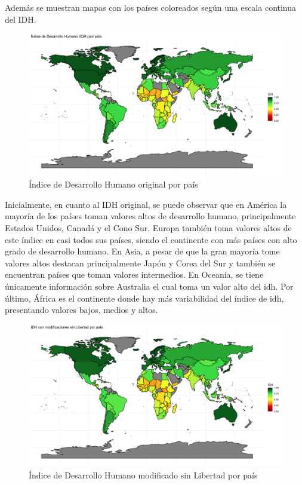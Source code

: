 \documentclass[
  10pt,
]{article}
\begin{document}
Además se muestran mapas con los países coloreados según una escala
continua del IDH.

\begin{figure}

{\centering \includegraphics[width=1\linewidth]{Resultados/mapa_IDH1} 

}

\caption{Índice de Desarrollo Humano original por país}\label{fig:mapa1}
\end{figure}

Inicialmente, en cuanto al IDH original, se puede observar que en
América la mayoría de los países toman valores altos de desarrollo
humano, principalmente Estados Unidos, Canadá y el Cono Sur. Europa
también toma valores altos de este índice en casi todos sus países,
siendo el continente con más países con alto grado de desarrollo humano.
En Asia, a pesar de que la gran mayoría tome valores altos destacan
principalmente Japón y Corea del Sur y también se encuentran países que
toman valores intermedios. En Oceanía, se tiene únicamente información
sobre Australia el cual toma un valor alto del idh. Por último, África
es el continente donde hay más variabilidad del índice de idh,
presentando valores bajos, medios y altos.

\begin{figure}

{\centering \includegraphics[width=1\linewidth]{Resultados/mapa_IDH2} 

}

\caption{Índice de Desarrollo Humano modificado sin Libertad por país}\label{fig:mapa2}
\end{figure}
\end{document}

